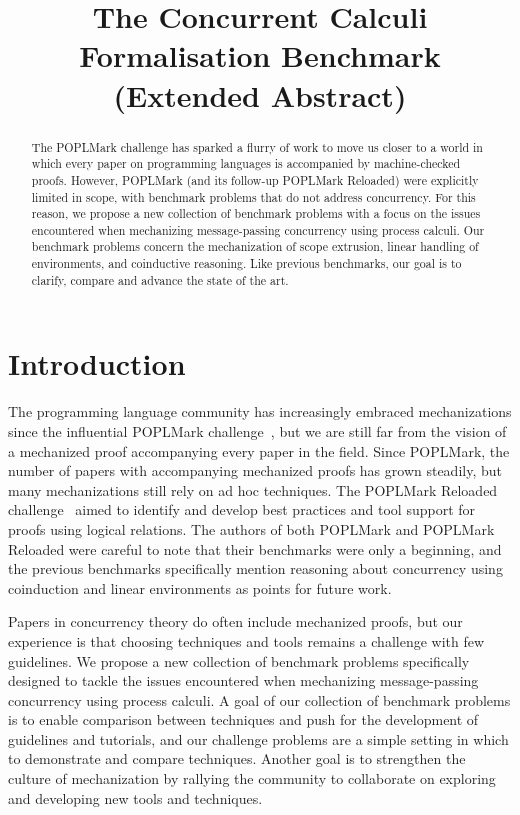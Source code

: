 \documentclass[adraft,copyright,creativecommons]{eptcs}
\title{The Concurrent Calculi Formalisation Benchmark\\{\normalsize(Extended Abstract)}}
\begin{document}
\maketitle

\begin{abstract}
  The POPLMark challenge has sparked a flurry of work to move us closer to a world in which every paper on programming languages is accompanied by machine-checked proofs.
  However, POPLMark (and its follow-up POPLMark Reloaded) were explicitly limited in scope,
  with benchmark problems that do not address concurrency. For this reason, we propose a new collection of benchmark problems with a focus on the issues encountered when mechanizing message-passing concurrency using process calculi.
  Our benchmark problems concern the mechanization of scope extrusion, linear handling of environments, and coinductive reasoning.
  Like previous benchmarks, our goal is to clarify, compare and advance the state of the art.
\end{abstract}

\section{Introduction}
The programming language community has increasingly embraced mechanizations since the influential POPLMark challenge~\cite{POPLMark}, but we are still far from the vision of a mechanized proof accompanying every paper in the field.
Since POPLMark, the number of papers with accompanying mechanized proofs has grown steadily, but many mechanizations still rely on ad hoc techniques.
The POPLMark Reloaded challenge~\cite{POPLMarkReloaded} aimed to identify and develop best practices and tool support for proofs using logical relations.
The authors of both POPLMark and POPLMark Reloaded were careful to note that their benchmarks were only a beginning, and the previous benchmarks specifically mention reasoning about concurrency using coinduction and linear environments as points for future work.

Papers in concurrency theory do often include mechanized proofs, but our experience is that choosing techniques and tools remains a challenge with few guidelines.
We propose a new collection of benchmark problems specifically designed to tackle the issues encountered when mechanizing message-passing concurrency using process calculi.
A goal of our collection of benchmark problems is to enable comparison between techniques and push for the development of guidelines and tutorials, and our challenge problems are a simple setting in which to demonstrate and compare techniques.
Another goal is to strengthen the culture of mechanization by rallying the community to collaborate on exploring and developing new tools and techniques.
\end{document}
